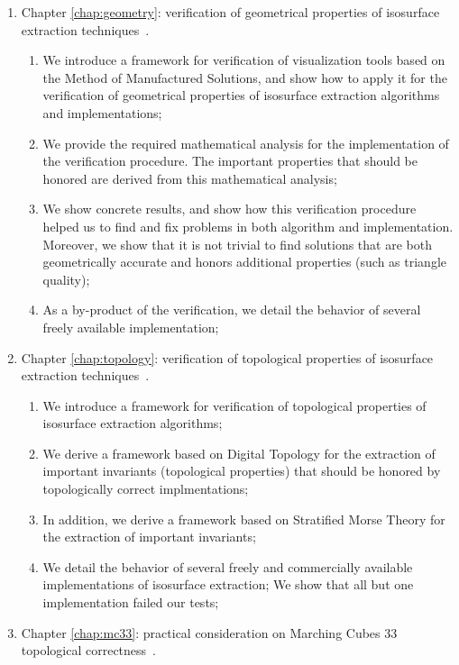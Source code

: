 \begin{enumerate}
\item Chapter \ref{chap:geometry}: verification of geometrical properties of isosurface extraction techniques~\cite{etiene:tvcg:2009}.
\begin{enumerate}
\item We introduce a framework for verification of visualization tools based on the Method of Manufactured Solutions, and show how to apply it for the verification of geometrical properties of isosurface extraction algorithms and implementations;
\item We provide the required mathematical analysis for the implementation of the verification procedure. The important properties that should be honored are derived from this mathematical analysis;
\item We show concrete results, and show how this verification procedure helped us to find and fix problems in both algorithm and implementation. Moreover, we show that it is not trivial to find solutions that are both geometrically accurate and honors additional properties (such as triangle quality);
\item As a by-product of the verification, we detail the behavior of several freely available implementation;
\end{enumerate}
\item Chapter \ref{chap:topology}: verification of topological properties of isosurface extraction techniques~\cite{Etiene:2012:TVI:2197070.2197097}.
\begin{enumerate}
\item We introduce a framework for verification of topological properties of isosurface extraction algorithms;
\item We derive a framework based on Digital Topology for the extraction of important invariants (topological properties) that should be honored by topologically correct implmentations;
\item In addition, we derive a framework based on Stratified Morse Theory for the extraction of important invariants;
\item We detail the behavior of several freely and commercially available implementations of isosurface extraction; We show that all but one implementation failed our tests;
\end{enumerate}
\item Chapter \ref{chap:mc33}: practical consideration on Marching Cubes 33 topological correctness~\cite{Lis2013}.
\begin{enumerate}

\end{enumerate}
\end{enumerate}
